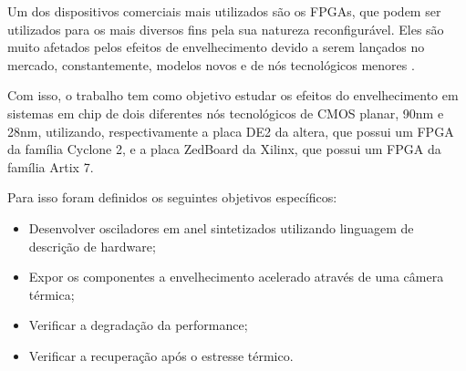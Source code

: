 Um dos dispositivos comerciais mais utilizados são os FPGAs, que podem ser utilizados para os mais diversos fins pela sua natureza reconfigurável. Eles são muito afetados pelos efeitos de envelhecimento devido a serem lançados no mercado, constantemente, modelos novos e de nós tecnológicos menores \cite{Degalahal}.

Com isso, o trabalho tem como objetivo estudar os efeitos do envelhecimento em sistemas em chip de dois diferentes nós tecnológicos de CMOS planar, 90nm e 28nm, utilizando, respectivamente a placa DE2 da altera, que possui um FPGA da família Cyclone 2, e a placa ZedBoard da Xilinx, que possui um FPGA da família Artix 7.

Para isso foram definidos os seguintes objetivos específicos:
\begin{itemize}
    \item Desenvolver osciladores em anel sintetizados utilizando linguagem de descrição de hardware;
    \item Expor os componentes a envelhecimento acelerado através de uma câmera térmica;
    \item Verificar a degradação da performance;
    \item Verificar a recuperação após o estresse térmico.
\end{itemize}








